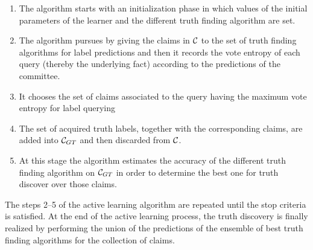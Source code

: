 \begin{enumerate}
\item The algorithm starts with an initialization phase in which values of the initial parameters of the learner and the different truth 
finding algorithm are set.
 \item The algorithm pursues by giving the claims in $\mathcal{C}{}$ to the set of truth finding algorithms for label predictions and then 
 it records the vote entropy of each query (thereby the underlying fact) according to the predictions of the committee.
 \item It chooses the set of claims associated to the query having the maximum vote entropy for label querying
 \item The set of acquired truth labels, together with the corresponding claims, are added into  $\mathcal{C}_{GT}$ and then discarded from $\mathcal{C}{}$.
 \item At this stage the algorithm estimates the accuracy of the different truth finding algorithm on  $\mathcal{C}_{GT}$ in order to determine the best one
 for truth discover over those claims.
\end{enumerate}

The steps 2--5 of the active learning algorithm are repeated until the stop criteria is satisfied. 
At the end of the active learning process, the truth discovery is finally realized by performing 
the union of the predictions of the ensemble of best truth finding algorithms for the collection 
of claims. 

